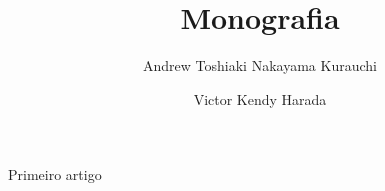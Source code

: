 \documentclass[11pt]{article}
\begin{document}
\title{Monografia}
\author{Andrew Toshiaki Nakayama Kurauchi \and Victor Kendy Harada}
\maketitle

Primeiro artigo~\cite{citeulike:3787472}

\newpage 

\end{document}
